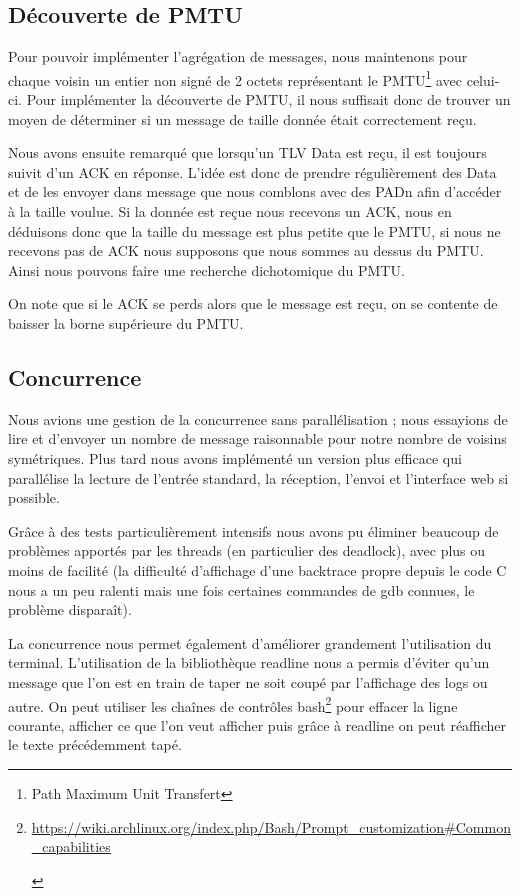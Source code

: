 \documentclass[a4paper,10pt]{article} %
\let\urlorig\url
\renewcommand{\url}[1]{\begin{otherlanguage}{english}\urlorig{#1}\end{otherlanguage}}
\begin{document}
\subsection{Découverte de PMTU\label{sec:pmtu}}

Pour pouvoir implémenter l'agrégation de messages, nous maintenons pour chaque voisin un entier non signé de 2 octets représentant le \textrm{PMTU}\footnote{Path Maximum Unit Transfert} avec celui-ci. Pour implémenter la découverte de \textrm{PMTU}, il nous suffisait donc de trouver un moyen de déterminer si un message de taille donnée était correctement reçu.

Nous avons ensuite remarqué que lorsqu'un TLV Data est reçu, il est toujours suivit d'un ACK en réponse. L'idée est donc de prendre régulièrement des Data et de les envoyer dans message que nous comblons avec des PADn afin d’accéder à la taille voulue. Si la donnée est reçue nous recevons un ACK, nous en déduisons donc que la taille du message est plus petite que le \textrm{PMTU}, si nous ne recevons pas de ACK nous supposons que nous sommes au dessus du \textrm{PMTU}. Ainsi nous pouvons faire une recherche dichotomique du PMTU.

On note que si le ACK se perds alors que le message est reçu, on se contente de baisser la borne supérieure du PMTU.

\subsection{Concurrence\label{sec:con}}
Nous avions une gestion de la concurrence sans parallélisation ; nous essayions de lire et d'envoyer un nombre de message raisonnable pour notre nombre de voisins symétriques. Plus tard nous avons implémenté un version plus efficace qui parallélise la lecture de l'entrée standard, la réception, l'envoi et l'interface web si possible.

Grâce à des tests particulièrement intensifs nous avons pu éliminer beaucoup de problèmes apportés par les threads (en particulier des deadlock), avec plus ou moins de facilité (la difficulté d'affichage d'une backtrace propre depuis le code C nous a un peu ralenti mais une fois certaines commandes de gdb connues, le problème disparaît).

La concurrence nous permet également d'améliorer grandement l'utilisation du terminal. L'utilisation de la bibliothèque readline nous a permis d'éviter qu'un message que l'on est en train de taper ne soit coupé par l'affichage des logs ou autre. On peut utiliser les chaînes de contrôles bash\footnote{\url{https://wiki.archlinux.org/index.php/Bash/Prompt\_customization\#Common\_capabilities}} pour effacer la ligne courante, afficher ce que l'on veut afficher puis grâce à readline on peut réafficher le texte précédemment tapé.
\end{document}
